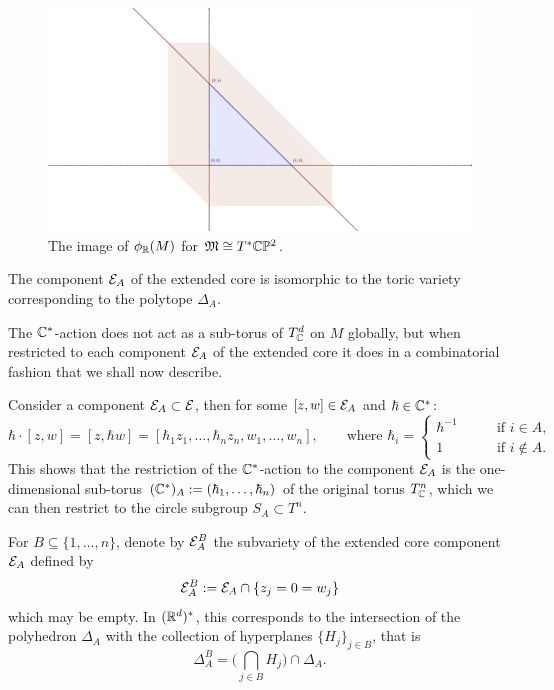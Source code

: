 \begin{figure}[h!]
	\includegraphics[width=1.2\linewidth]{Cotangent_CP2.png}
	\caption{The image of $\phi_{\mathbb{R}}(M)$ for $\mathfrak{M} \cong T^{\ast}\mathbb{C}\mathbb{P}^{2}$.}
	\label{fig:test1}
\end{figure}

\begin{lem}
	The component $\mathcal{E}_{A}$ of the extended core is isomorphic to the toric variety corresponding to the polytope $\Delta_{A}$.
\end{lem}

The $\mathbb{C}^{\ast}$-action does not act as a sub-torus of $T_{\mathbb{C}}^{d}$ on $M$ globally, but when restricted to each component $\mathcal{E}_{A}$ of the extended core it does in a combinatorial fashion that we shall now describe.

Consider a component $\mathcal{E}_{A} \subset \mathcal{E}$, then for some $[z,w] \in \mathcal{E}_{A}$ and $\hbar \in \mathbb{C}^{\ast}$:
\begin{equation*}
	\hbar \cdot [z,w] = [z,\hbar w] = [\hbar_{1} z_{1}, \ldots, \hbar_{n} z_{n}, w_{1}, \ldots , w_{n}     ],\qquad \text{where } \hbar_{i} = 
	\begin{cases}
	\hbar^{-1}\qquad &\text{if } i \in A,\\
	1\qquad &\text{if } i \not\in A.
	\end{cases}
\end{equation*}
This shows that the restriction of the $\mathbb{C}^{\ast}$-action to the component $\mathcal{E}_{A}$ is the one-dimensional sub-torus $(\mathbb{C}^{\ast})_{A} := (\hbar_{1}, \ldots, \hbar_{n})$ of the original torus $T_{\mathbb{C}}^{n}$, which we can then restrict to the circle subgroup $S_{A} \subset T^{n}$.

For $B \subseteq \{1,\ldots, n\}$, denote by $\mathcal{E}_{A}^{B}$ the subvariety of the extended core component $\mathcal{E}_{A}$ defined by
\begin{equation*}
	\mathcal{E}_{A}^{B} := \mathcal{E}_{A} \cap \{z_{j} = 0 = w_{j}\}
\end{equation*}
which may be empty. In $(\mathbb{R}^{d})^{\ast}$, this corresponds to the intersection of the polyhedron $\Delta_{A}$ with the collection of hyperplanes $\{ H_{j}  \}_{j \in B}$, that is
\begin{equation*}
	\Delta_{A}^{B} = \bigg( \bigcap_{j \in B} H_{j} \bigg) \cap \Delta_{A}.
\end{equation*}

